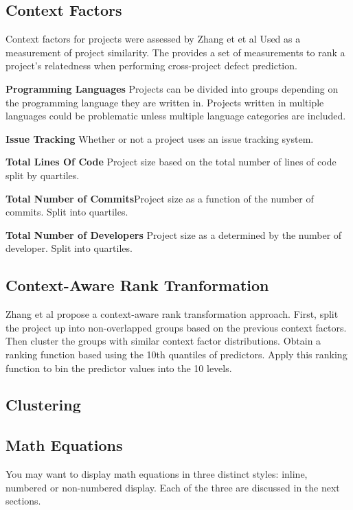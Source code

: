 \documentclass{sig-alternate-05-2015}
\begin{document}
\subsection{Context Factors}
Context factors for projects were assessed by Zhang et et al \cite{Zhang:2014:TBU:2597073.2597078}  Used as a measurement of project similarity. The provides a set of measurements to rank a project's relatedness when performing cross-project defect prediction.

\textbf{Programming Languages} Projects can be divided into groups depending on the programming language they are written in. Projects written in multiple languages could be problematic unless multiple language categories are included.

\textbf{Issue Tracking} Whether or not a project uses an issue tracking system.

\textbf{Total Lines Of Code} Project size based on the total number of lines of code split by quartiles.

\textbf{Total Number of Commits}Project size as a function of the number of commits. Split into quartiles.

\textbf{Total Number of Developers} Project size as a determined by the number of developer. Split into quartiles.

\subsection{Context-Aware Rank Tranformation}
Zhang et al \cite{Zhang:2014:TBU:2597073.2597078} propose a context-aware rank transformation approach. First, split the project up into non-overlapped groups based on the previous context factors. Then cluster the groups with similar context factor distributions. Obtain a ranking function based using the 10th quantiles of predictors. Apply this ranking function to bin the predictor values into the 10 levels.

\subsection{Clustering}



\subsection{Math Equations}
You may want to display math equations in three distinct styles:
inline, numbered or non-numbered display.  Each of
the three are discussed in the next sections.
\end{document}
